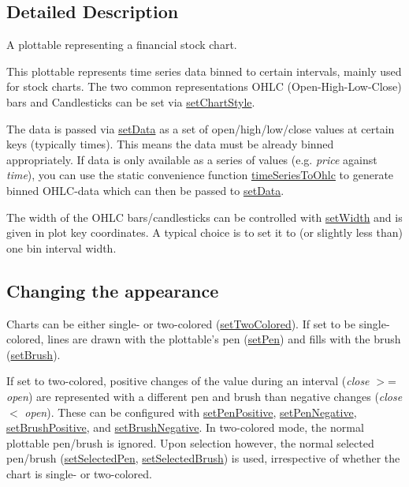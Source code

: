 \subsection{\-Detailed \-Description}
\-A plottable representing a financial stock chart. 



\-This plottable represents time series data binned to certain intervals, mainly used for stock charts. \-The two common representations \-O\-H\-L\-C (\-Open-\/\-High-\/\-Low-\/\-Close) bars and \-Candlesticks can be set via \hyperlink{classQCPFinancial_a5a59175d36279d71596e64d7bb65596f}{set\-Chart\-Style}.

\-The data is passed via \hyperlink{classQCPFinancial_adf12a86082f1e488df6a4e8603f8fd6d}{set\-Data} as a set of open/high/low/close values at certain keys (typically times). \-This means the data must be already binned appropriately. \-If data is only available as a series of values (e.\-g. {\itshape price\/} against {\itshape time\/}), you can use the static convenience function \hyperlink{classQCPFinancial_a0c3453d1c03e320950fdd2df54e3ebc8}{time\-Series\-To\-Ohlc} to generate binned \-O\-H\-L\-C-\/data which can then be passed to \hyperlink{classQCPFinancial_adf12a86082f1e488df6a4e8603f8fd6d}{set\-Data}.

\-The width of the \-O\-H\-L\-C bars/candlesticks can be controlled with \hyperlink{classQCPFinancial_a99633f8bac86a61d534ae5eeb1a3068f}{set\-Width} and is given in plot key coordinates. \-A typical choice is to set it to (or slightly less than) one bin interval width.\hypertarget{classQCPStatisticalBox_appearance}{}\subsection{\-Changing the appearance}\label{classQCPStatisticalBox_appearance}
\-Charts can be either single-\/ or two-\/colored (\hyperlink{classQCPFinancial_a138e44aac160a17a9676652e240c5f08}{set\-Two\-Colored}). \-If set to be single-\/colored, lines are drawn with the plottable's pen (\hyperlink{classQCPAbstractPlottable_ab74b09ae4c0e7e13142fe4b5bf46cac7}{set\-Pen}) and fills with the brush (\hyperlink{classQCPAbstractPlottable_a7a4b92144dca6453a1f0f210e27edc74}{set\-Brush}).

\-If set to two-\/colored, positive changes of the value during an interval ({\itshape close\/} $>$= {\itshape open\/}) are represented with a different pen and brush than negative changes ({\itshape close\/} $<$ {\itshape open\/}). \-These can be configured with \hyperlink{classQCPFinancial_ac58aa3adc7a35aab0088764b840683e5}{set\-Pen\-Positive}, \hyperlink{classQCPFinancial_afe5c07e94ccea01a75b3a2476993c346}{set\-Pen\-Negative}, \hyperlink{classQCPFinancial_a5ebff2b1764efd07cc44942e67821829}{set\-Brush\-Positive}, and \hyperlink{classQCPFinancial_a8bbdd87629f9144b3ef51af660c0961a}{set\-Brush\-Negative}. \-In two-\/colored mode, the normal plottable pen/brush is ignored. \-Upon selection however, the normal selected pen/brush (\hyperlink{classQCPAbstractPlottable_a6911603cad23ab0469b108224517516f}{set\-Selected\-Pen}, \hyperlink{classQCPAbstractPlottable_ae8c816874089f7a44001e8618e81a9dc}{set\-Selected\-Brush}) is used, irrespective of whether the chart is single-\/ or two-\/colored. 

